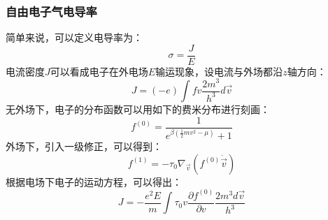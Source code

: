 \documentclass{if-beamer}
\begin{document}
\begin{frame}
    \frametitle{自由电子气电导率}
        简单来说，可以定义电导率为：
        \begin{equation*}
            \sigma=\frac{J}{E}
        \end{equation*}
        电流密度$J$可以看成电子在外电场$E$输运现象，设电流与外场都沿$z$轴方向：
        \begin{equation*}
            J=(-e) \int f v \frac{2 m^{3}}{h^{3}} d \vec{v}
        \end{equation*}
        无外场下，电子的分布函数可以用如下的费米分布进行刻画：
        \begin{equation*}
            f^{(0)}=\frac{1}{e^{\beta\left(\frac{1}{2} m {v}^{2}-\mu\right)}+1}
        \end{equation*}
        外场下，引入一级修正，可以得到：
        \begin{equation*}
            f^{(1)}=-\tau_{0} \nabla_{\vec{v}}\left(f^{(0)} \dot{\vec{v}}\right)
        \end{equation*}
        根据电场下电子的运动方程，可以得出：
        \begin{equation*}
            J=-\frac{e^{2} {E}}{m} \int \tau_{0} v \frac{\partial f^{(0)}}{\partial v} \frac{2 m^{3} d \vec{v}}{h^{3}}
        \end{equation*}
\end{frame}
\end{document}
